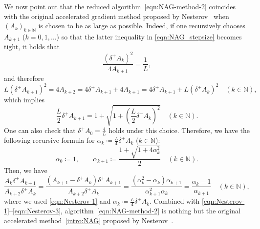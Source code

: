 \documentclass[11pt,a4paper]{article}
\theoremstyle{definition}
\theoremstyle{plain}
\newcommand{\NN}{{\mathbb{N}}}
\begin{document}
We now point out that the reduced algorithm~\eqref{eqn:NAG-method-2} coincides with the original accelerated gradient method proposed by Nesterov~\cite{Nesterov1983} when $(A_k)_{k \in \NN}$ is chosen to be as large as possible.
Indeed, if one recursively chooses $A_{k + 1}$ ($k = 0, 1, \ldots$) so that the latter inequality in \eqref{eqn:NAG_stepsize} becomes tight, it holds that
\begin{equation}\label{eqn:Nesterov-1}
    \frac{(\delta^+A_k)^2}{4A_{k + 1}} = \frac1L,
\end{equation}
and therefore
\[
    L(\delta^+A_{k + 1})^2 = 4A_{k + 2} = 4\delta^+A_{k + 1} + 4A_{k + 1} = 4\delta^+A_{k + 1} + L(\delta^+A_k)^2 \quad (k \in \NN),
\]
which implies
\[
    \frac{L}2\delta^+A_{k + 1} = 1 + \sqrt{1 + \left(\frac{L}2\delta^+A_k\right)^2} \quad (k \in \NN).
\]
One can also check that $\delta^+A_0 = \frac4L$ holds under this choice.
Therefore, we have the following recursive formula for $\alpha_k \coloneqq \frac{L}4\delta^+A_k$ ($k \in \NN$):
\begin{equation}\label{eqn:Nesterov-2}
    \alpha_0 \coloneqq 1,\qquad \alpha_{k + 1} \coloneqq \frac{1 + \sqrt{1 + 4\alpha_k^2}}2 \quad (k \in \NN).
\end{equation}
Then, we have
\begin{equation}\label{eqn:Nesterov-3}
    \frac{A_k\delta^+A_{k + 1}}{A_{k + 2}\delta^+A_k} = \frac{(A_{k + 1} - \delta^+A_k)\delta^+A_{k + 1}}{A_{k + 2}\delta^+A_k} = \frac{(\alpha_k^2 - \alpha_k)\alpha_{k + 1}}{\alpha_{k + 1}^2\alpha_k} = \frac{\alpha_k - 1}{\alpha_{k + 1}} \quad (k \in \NN),
\end{equation}
where we used \eqref{eqn:Nesterov-1} and $\alpha_k \coloneqq \frac{L}4\delta^+A_k$.
Combined with \eqref{eqn:Nesterov-1}--\eqref{eqn:Nesterov-3}, algorithm~\eqref{eqn:NAG-method-2} is nothing but the original accelerated method~\eqref{intro:NAG} proposed by Nesterov~\cite{Nesterov1983}.
\end{document}
